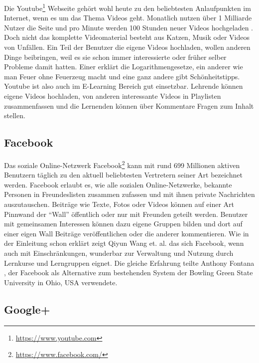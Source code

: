 Die Youtube\footnote{\url{https://www.youtube.com}} Webseite gehört wohl heute zu den beliebtesten Anlaufpunkten im Internet, wenn es um das Thema Videos geht. Monatlich nutzen über 1 Milliarde Nutzer die Seite und pro Minute werden 100 Stunden neuer Videos hochgeladen \cite{youtube2013statistics}. Doch nicht das komplette Videomaterial besteht aus Katzen, Musik oder Videos von Unfällen. Ein Teil der Benutzer die eigene Videos hochladen, wollen anderen Dinge beibringen, weil es sie schon immer interessierte oder früher selber Probleme damit hatten. Einer erklärt die Logarithmengesetze, ein anderer wie man Feuer ohne Feuerzeug macht und eine ganz andere gibt Schönheitstipps. Youtube ist also auch im E-Learning Bereich gut einsetzbar. Lehrende können eigene Videos hochladen, von anderen interessante Videos in Playlisten zusammenfassen und die Lernenden können über Kommentare Fragen zum Inhalt stellen. 


\subsection{Facebook} %
\label{sub:facebook}

Das soziale Online-Netzwerk Facebook\footnote{\url{https://www.facebook.com/}} kann mit rund 699 Millionen aktiven Benutzern täglich \cite{Facebook2013} zu den aktuell beliebtesten Vertretern seiner Art bezeichnet werden. Facebook erlaubt es, wie alle sozialen Online-Netzwerke, bekannte Personen in Freundeslisten zusammen zufassen und mit ihnen private Nachrichten auszutauschen. Beiträge wie Texte, Fotos oder Videos können auf einer Art Pinnwand der \enquote{Wall} öffentlich oder nur mit Freunden geteilt werden. Benutzer mit gemeinsamen Interessen können dazu eigene Gruppen bilden und dort auf einer eigen Wall Beiträge veröffentlichen oder die anderer kommentieren. Wie in der Einleitung schon erklärt zeigt Qiyun Wang et. al. \cite{Wang2012} das sich Facebook, wenn auch mit Einschränkungen, wunderbar zur Verwaltung und Nutzung durch Lernkurse und Lerngruppen eignet. Die gleiche Erfahrung teilte Anthony Fontana \cite{Fontana2009,FacebookinEducarion2010}, der Facebook als Alternative zum bestehenden System der Bowling Green State University in Ohio, USA verwendete.


\subsection{Google+} %
\label{sub:google_plus}

